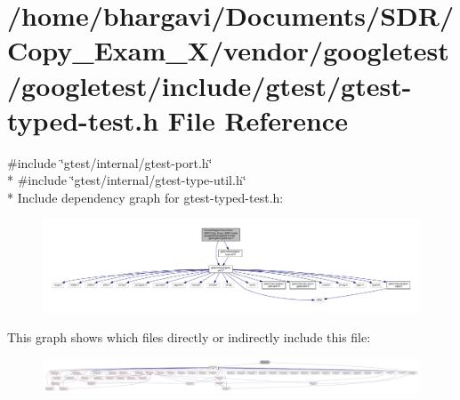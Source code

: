 \hypertarget{gtest-typed-test_8h}{}\section{/home/bhargavi/\+Documents/\+S\+D\+R/\+Copy\+\_\+\+Exam\+\_\+X/vendor/googletest/googletest/include/gtest/gtest-\/typed-\/test.h File Reference}
\label{gtest-typed-test_8h}
{\ttfamily \#include \char`\"{}gtest/internal/gtest-\/port.\+h\char`\"{}}\\*
{\ttfamily \#include \char`\"{}gtest/internal/gtest-\/type-\/util.\+h\char`\"{}}\\*
Include dependency graph for gtest-\/typed-\/test.h\+:
\nopagebreak
\begin{figure}[H]
\begin{center}
\leavevmode
\includegraphics[width=350pt]{gtest-typed-test_8h__incl}
\end{center}
\end{figure}
This graph shows which files directly or indirectly include this file\+:
\nopagebreak
\begin{figure}[H]
\begin{center}
\leavevmode
\includegraphics[width=350pt]{gtest-typed-test_8h__dep__incl}
\end{center}
\end{figure}
